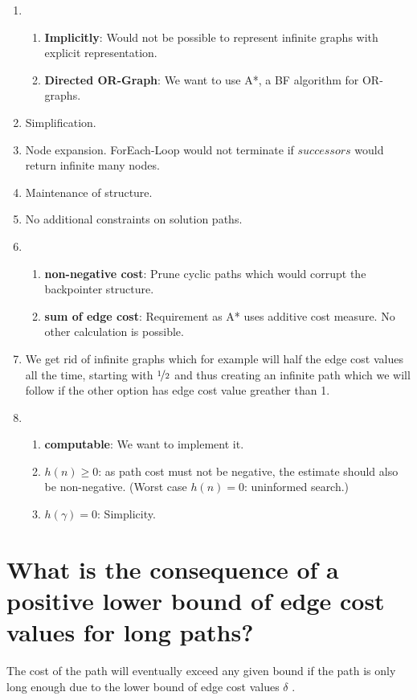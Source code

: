 \documentclass[12pt, a4paper]{article}
\begin{document}
\begin{enumerate}
\item 
	\begin{enumerate}[label=(\alph*)] 
	\item \textbf{Implicitly}: Would not be possible to represent infinite graphs with explicit representation.
	\item \textbf{Directed OR-Graph}: We want to use A*, a BF algorithm for OR-graphs.
	\end{enumerate}
\item Simplification.
\item Node expansion. ForEach-Loop would not terminate if $successors$ would return infinite many nodes.
\item Maintenance of structure.
\item No additional constraints on solution paths.
\item 
	\begin{enumerate}[label=(\alph*)] 
	\item \textbf{non-negative cost}: Prune cyclic paths which would corrupt the backpointer structure.
	\item \textbf{sum of edge cost}: Requirement as A* uses additive cost measure. No other calculation is possible.
	\end{enumerate}
\item We get rid of infinite graphs which for example will half the edge cost values all the time, starting with $\nicefrac{1}{2}$ and thus creating an infinite path which we will follow if the other option has edge cost value greather than 1.
\item 
	\begin{enumerate}[label=(\alph*)] 
	\item \textbf{computable}: We want to implement it.
	\item \textbf{$h(n) \geq 0$}: as path cost must not be negative, the estimate should also be non-negative. (Worst case $h(n) = 0$: uninformed search.)
	\item \textbf{$h(\gamma) = 0$}: Simplicity.
	\end{enumerate}
\end{enumerate}

\section{What is the consequence of a positive lower bound of edge cost values for long paths?}
The cost of the path will eventually exceed any given bound if the path is only long enough due to the lower bound of edge cost values $\delta$ .
\end{document}
